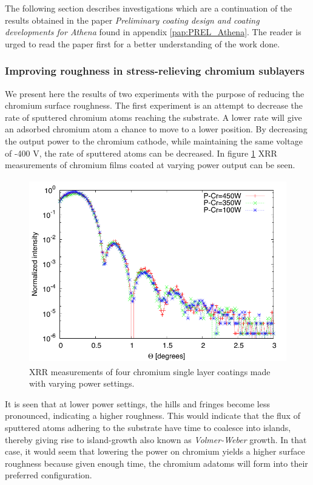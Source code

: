The following section describes investigations which are a continuation of the results obtained in the paper \emph{Preliminary coating design and coating
developments for Athena} found in appendix \ref{pap:PREL_Athena}. The reader is urged to read the paper first for a better understanding of the work done.

\subsubsection{Improving roughness in stress-relieving chromium sublayers}
We present here the results of two experiments with the purpose of reducing the chromium surface roughness. The first experiment is an attempt to decrease the rate of sputtered chromium atoms reaching the substrate. A lower rate will give an adsorbed chromium atom a chance to move to a lower position\cite{Venables:1984wu}. By decreasing the output power to the chromium cathode, while maintaining the same voltage of -400 V, the rate of sputtered atoms can be decreased. In figure \ref{fig:cr-power-change} XRR measurements of chromium films coated at varying power output can be seen.

\begin{figure}[!h]
	\center
	\includegraphics[height=8cm]{figures/athena/coatings/cr-power-change.pdf}
\caption{\footnotesize XRR measurements of four chromium single layer coatings made with varying power settings.}\label{fig:cr-power-change}
\end{figure}

It is seen that at lower power settings, the hills and fringes become less pronounced, indicating a higher roughness. This would indicate that the flux of sputtered atoms adhering to the substrate have time to coalesce into islands, thereby giving rise to island-growth also known as \emph{Volmer-Weber} growth\cite{Thompson:2000ge}. In that case, it would seem that lowering the power on chromium yields a higher surface roughness because given enough time, the chromium adatoms will form into their preferred configuration.

